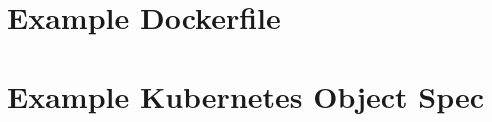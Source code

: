 \documentclass[12pt,oneandhalf,chaparabic,ceng,ms,eng,oneside,pntc]{gsufbe}
\begin{document}
\chapter[]{Example Dockerfile}
\thispagestyle{empty}
\label{appendix:docker}


\chapter[]{Example Kubernetes Object Spec}
\thispagestyle{empty}
\label{appendix:k8spec}

\newpage




\thispagestyle{empty}
\end{document}
